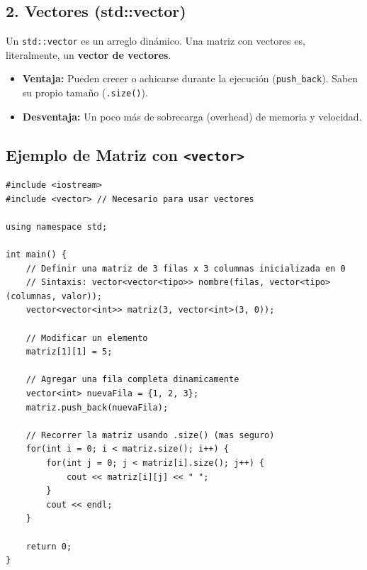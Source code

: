 \documentclass{article}
\begin{document}
\subsection{2. Vectores (std::vector)}
Un \texttt{std::vector} es un arreglo dinámico. Una matriz con vectores es, literalmente, un \textbf{vector de vectores}.
\begin{itemize}
    \item \textbf{Ventaja:} Pueden crecer o achicarse durante la ejecución (\texttt{push\_back}). Saben su propio tamaño (\texttt{.size()}).
    \item \textbf{Desventaja:} Un poco más de sobrecarga (overhead) de memoria y velocidad.
\end{itemize}

\subsection{Ejemplo de Matriz con \texttt{<vector>}}

\begin{lstlisting}
#include <iostream>
#include <vector> // Necesario para usar vectores

using namespace std;

int main() {
    // Definir una matriz de 3 filas x 3 columnas inicializada en 0
    // Sintaxis: vector<vector<tipo>> nombre(filas, vector<tipo>(columnas, valor));
    vector<vector<int>> matriz(3, vector<int>(3, 0));

    // Modificar un elemento
    matriz[1][1] = 5;

    // Agregar una fila completa dinamicamente
    vector<int> nuevaFila = {1, 2, 3};
    matriz.push_back(nuevaFila);

    // Recorrer la matriz usando .size() (mas seguro)
    for(int i = 0; i < matriz.size(); i++) {
        for(int j = 0; j < matriz[i].size(); j++) {
            cout << matriz[i][j] << " ";
        }
        cout << endl;
    }

    return 0;
}
\end{lstlisting}
\end{document}
